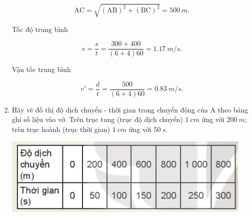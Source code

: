 \begin{enumerate}[label=\bfseries Bài \arabic*:,leftmargin=1.5cm]
{		$$\text{AC} = \sqrt{(\text{AB})^2 + (\text{BC})^2} = \SI{500}{m}.$$
		
		Tốc độ trung bình 
		
		$$v= \dfrac{s}{t} = \dfrac{300+400}{(6 + 4)60}  = \SI{1,17}{m/s}.$$
		
		Vận tốc trung bình
		
		$$v'=\dfrac{d}{t}=\dfrac{500}{(6+4)60} = \SI{0,83}{m/s}.$$
	}

	\item {}
	
	{
		Hãy vẽ đồ thị độ dịch chuyển - thời gian trong chuyển động của A theo bảng ghi số liệu vào vở. Trên trục tung (trục độ dịch chuyển) $\SI{1}{cm}$ ứng với $\SI{200}{m}$; trên trục hoành (trục thời gian) $\SI{1}{cm}$ ứng với $\SI{50}{s}$.
		
		\begin{center}
			\includegraphics[scale=1]{../figs/VN10-2022-PH-TP006-5.jpg}
		\end{center}
		
	}
\end{enumerate}
